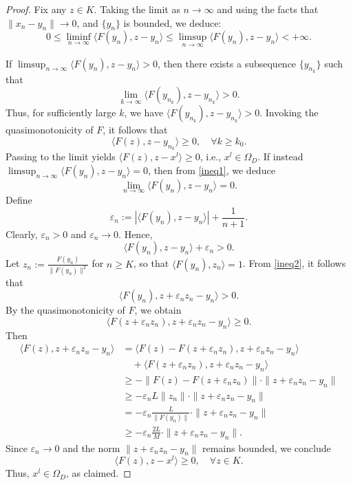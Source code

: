 \documentclass[10pt,a4paper]{amsart}
\begin{document}
\begin{proof}
Fix any \( z \in K \). Taking the limit as \( n \to \infty \) and using the facts that \( \|x_n - y_n\| \to 0 \),  and \( \{y_n\} \) is bounded, we deduce:
\begin{equation} \label{ineq1}
    0 \leq \liminf_{n \to \infty} \langle F(y_n), z - y_n \rangle \leq \limsup_{n \to \infty} \langle F(y_n), z - y_n \rangle < +\infty.
\end{equation}

If \( \limsup_{n \to \infty} \langle F(y_n), z - y_n \rangle > 0 \), then there exists a subsequence \( \{y_{n_k}\} \) such that
\[
\lim_{k \to \infty} \langle F(y_{n_k}), z - y_{n_k} \rangle > 0.
\]
Thus, for sufficiently large \( k \), we have \( \langle F(y_{n_k}), z - y_{n_k} \rangle > 0 \). Invoking the quasimonotonicity of \( F \), it follows that
\[
\langle F(z), z - y_{n_k} \rangle \geq 0, \quad \forall k \geq k_0.
\]
Passing to the limit yields \( \langle F(z), z - x^l \rangle \geq 0 \), i.e., \( x^l \in \Omega_D \).
\vskip 2mm
If instead \( \limsup_{n \to \infty} \langle F(y_n), z - y_n \rangle = 0 \), then from \eqref{ineq1}, we deduce
\[
\lim_{n \to \infty} \langle F(y_n), z - y_n \rangle = 0.
\]
Define
\[
\varepsilon_n := |\langle F(y_n), z - y_n \rangle| + \frac{1}{n+1}.
\]
Clearly, \( \varepsilon_n > 0 \) and \( \varepsilon_n \to 0 \). Hence,
\begin{equation} \label{ineq2}
    \langle F(y_n), z - y_n \rangle + \varepsilon_n > 0.
\end{equation}
Let \( z_n := \frac{F(y_n)}{\|F(y_n)\|^2} \) for \( n \geq K \), so that \( \langle F(y_n), z_n \rangle = 1 \). From \eqref{ineq2}, it follows that
\[
\langle F(y_n), z + \varepsilon_n z_n - y_n \rangle > 0.
\]
By the quasimonotonicity of \( F \), we obtain
\[
\langle F(z + \varepsilon_n z_n), z + \varepsilon_n z_n - y_n \rangle \geq 0.
\]
Then
\begin{align*}
\langle F(z), z + \varepsilon_n z_n - y_n \rangle 
&= \langle F(z) - F(z + \varepsilon_n z_n), z + \varepsilon_n z_n - y_n \rangle \\
&\quad + \langle F(z + \varepsilon_n z_n), z + \varepsilon_n z_n - y_n \rangle \\
&\geq -\|F(z) - F(z + \varepsilon_n z_n)\| \cdot \|z + \varepsilon_n z_n - y_n\| \\
&\geq -\varepsilon_n L \|z_n\| \cdot \|z + \varepsilon_n z_n - y_n\| \\
&= -\varepsilon_n \frac{L}{\|F(y_n)\|} \cdot \|z + \varepsilon_n z_n - y_n\| \\
&\geq -\varepsilon_n \frac{2L}{M} \cdot \|z + \varepsilon_n z_n - y_n\|.
\end{align*}
Since \( \varepsilon_n \to 0 \) and the norm \( \|z + \varepsilon_n z_n - y_n\| \) remains bounded, we conclude
\[
\langle F(z), z - x^l \rangle \geq 0, \quad \forall z \in K.
\]
Thus, \( x^l \in \Omega_D \), as claimed.
\end{proof}
\end{document}
